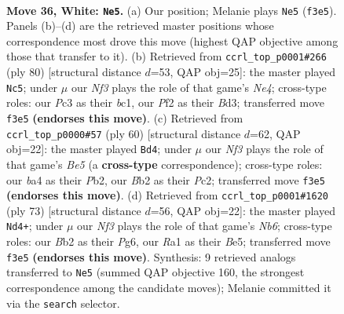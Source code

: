\documentclass[11pt]{article}
\begin{document}
\clearpage

\begin{figure}[p]\centering
\begin{subfigure}{0.46\textwidth}\centering
\resizebox{\linewidth}{!}{%
\newchessgame
\chessboard[
  setfen={r5k1/b3n3/8/pp6/b1p1p1P1/P1P2N2/1B2NP2/R3K3 w - - 0 36},
  showmover=false,
  pgfstyle=straightmove, color=movearrow, markmove={f3-e5}
]}
\caption{}
\end{subfigure}\hfill
\begin{subfigure}{0.46\textwidth}\centering
\resizebox{\linewidth}{!}{%
\newchessgame
\chessboard[
  setfen={5r1k/7p/1R4p1/4pb2/p3N2P/3B2P1/1P3P2/2b3K1 w - - 0 41},
  showmover=false,
  pgfstyle=straightmove, color=movearrow, markmove={e4-c5}
]}
\caption{}
\end{subfigure}
\\[4pt]
\begin{subfigure}{0.46\textwidth}\centering
\resizebox{\linewidth}{!}{%
\newchessgame
\chessboard[
  setfen={b3k2r/6pp/p4p2/3nBP2/Pp6/1N6/1PP3PP/2R3K1 w k - 0 31},
  showmover=false,
  pgfstyle=straightmove, color=movearrow, markmove={e5-d4}
]}
\caption{}
\end{subfigure}\hfill
\begin{subfigure}{0.46\textwidth}\centering
\resizebox{\linewidth}{!}{%
\newchessgame
\chessboard[
  setfen={2R5/p4pk1/1p4p1/4b1B1/1PB5/1n5P/4KPP1/r7 b - - 8 37},
  showmover=false,
  pgfstyle=straightmove, color=movearrow, markmove={b3-d4}
]}
\caption{}
\end{subfigure}
\caption{\textbf{Move 36, White: \texttt{Ne5}.} (a) Our position; Melanie plays \texttt{Ne5} (\texttt{f3e5}). Panels (b)--(d) are the retrieved master positions whose correspondence most drove this move (highest QAP objective among those that transfer to it). (b) Retrieved from \texttt{ccrl\_top\_p0001\#266} (ply 80) [structural distance $d$=53, QAP obj=25]: the master played \texttt{Nc5}; under $\mu$ our \emph{Nf3} plays the role of that game's \emph{Ne4}; cross-type roles: our \emph{P}c3 as their \emph{b}c1, our \emph{P}f2 as their \emph{B}d3; transferred move \texttt{f3e5} \textbf{(endorses this move)}. (c) Retrieved from \texttt{ccrl\_top\_p0000\#57} (ply 60) [structural distance $d$=62, QAP obj=22]: the master played \texttt{Bd4}; under $\mu$ our \emph{Nf3} plays the role of that game's \emph{Be5} (a \textbf{cross-type} correspondence); cross-type roles: our \emph{b}a4 as their \emph{P}b2, our \emph{B}b2 as their \emph{P}c2; transferred move \texttt{f3e5} \textbf{(endorses this move)}. (d) Retrieved from \texttt{ccrl\_top\_p0001\#1620} (ply 73) [structural distance $d$=56, QAP obj=22]: the master played \texttt{Nd4+}; under $\mu$ our \emph{Nf3} plays the role of that game's \emph{Nb6}; cross-type roles: our \emph{B}b2 as their \emph{P}g6, our \emph{R}a1 as their \emph{B}e5; transferred move \texttt{f3e5} \textbf{(endorses this move)}. Synthesis: 9 retrieved analogs transferred to \texttt{Ne5} (summed QAP objective 160, the strongest correspondence among the candidate moves); Melanie committed it via the \texttt{search} selector.}
\label{fig:thought-m70}
\end{figure}
\end{document}
